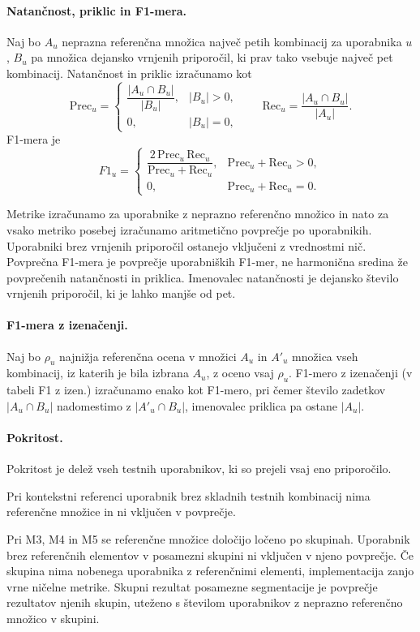 \documentclass[a4paper,twoside,openright,12pt,slovene]{book}
\begin{document}
\paragraph{Natančnost, priklic in F1-mera.}
Naj bo $A_u$ neprazna referenčna množica največ petih kombinacij
za uporabnika $u$, $B_u$ pa množica dejansko vrnjenih
priporočil, ki prav tako vsebuje največ pet kombinacij.
Natančnost in priklic izračunamo kot
\[
\mathrm{Prec}_u =
\begin{cases}
\dfrac{|A_u \cap B_u|}{|B_u|}, & |B_u|>0,\\
0, & |B_u|=0,
\end{cases}
\qquad
\mathrm{Rec}_u = \frac{|A_u \cap B_u|}{|A_u|}.
\]
F1-mera je
\[
F1_u =
\begin{cases}
\dfrac{2\,\mathrm{Prec}_u\,\mathrm{Rec}_u}
{\mathrm{Prec}_u+\mathrm{Rec}_u}, & \mathrm{Prec}_u+\mathrm{Rec}_u>0,\\
0, & \mathrm{Prec}_u+\mathrm{Rec}_u=0.
\end{cases}
\]

Metrike izračunamo za uporabnike z neprazno referenčno množico
in nato za vsako metriko posebej izračunamo aritmetično
povprečje po uporabnikih. Uporabniki brez vrnjenih priporočil
ostanejo vključeni z vrednostmi nič.
Povprečna F1-mera je povprečje uporabniških F1-mer, ne
harmonična sredina že povprečenih natančnosti in priklica.
Imenovalec natančnosti je dejansko število vrnjenih priporočil,
ki je lahko manjše od pet.

\paragraph{F1-mera z izenačenji.}
Naj bo $\rho_u$ najnižja referenčna ocena v množici $A_u$ in $A'_u$
množica vseh kombinacij, iz katerih je bila izbrana $A_u$,
z oceno vsaj $\rho_u$. F1-mero z izenačenji (v tabeli F1 z izen.) izračunamo enako
kot F1-mero, pri čemer število zadetkov $|A_u\cap B_u|$ nadomestimo
z $|A'_u\cap B_u|$, imenovalec priklica pa ostane $|A_u|$.

\paragraph{Pokritost.}
Pokritost je delež vseh testnih uporabnikov, ki so prejeli
vsaj eno priporočilo.

Pri kontekstni referenci uporabnik brez skladnih testnih
kombinacij nima referenčne množice in ni vključen v povprečje.

Pri M3, M4 in M5 se referenčne množice določijo ločeno po
skupinah. Uporabnik brez referenčnih elementov v posamezni
skupini ni vključen v njeno povprečje. Če skupina nima
nobenega uporabnika z referenčnimi elementi, implementacija
zanjo vrne ničelne metrike. Skupni rezultat posamezne
segmentacije je povprečje rezultatov njenih skupin, uteženo
s številom uporabnikov z neprazno referenčno množico v skupini.
\end{document}
